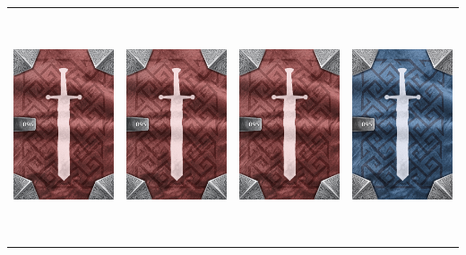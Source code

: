 \documentclass{minimal}
\begin{document}
{\begin{longtable}{llll}
\includegraphics[width=44mm,height=68mm]{./64-151/gh-096-rocket-boots-back.png} &
\includegraphics[width=44mm,height=68mm]{./64-151/gh-095b-scroll-of-stamina-back.png} &
\includegraphics[width=44mm,height=68mm]{./64-151/gh-095b-scroll-of-stamina-back.png} &
\includegraphics[width=44mm,height=68mm]{./64-151/gh-095a-scroll-of-stamina-back.png}\\ 

\end{longtable}}
\end{document}
